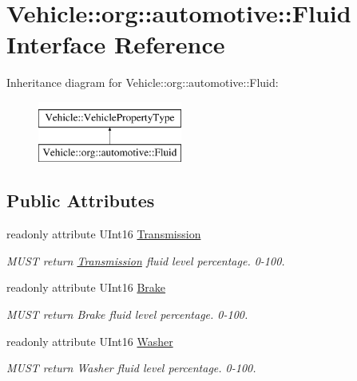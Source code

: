 \hypertarget{interfaceVehicle_1_1org_1_1automotive_1_1Fluid}{\section{Vehicle\-:\-:org\-:\-:automotive\-:\-:Fluid Interface Reference}
\label{interfaceVehicle_1_1org_1_1automotive_1_1Fluid}
}
Inheritance diagram for Vehicle\-:\-:org\-:\-:automotive\-:\-:Fluid\-:\begin{figure}[H]
\begin{center}
\leavevmode
\includegraphics[height=2.000000cm]{interfaceVehicle_1_1org_1_1automotive_1_1Fluid}
\end{center}
\end{figure}
\subsection*{Public Attributes}
\begin{DoxyCompactItemize}
\item 
readonly attribute U\-Int16 \hyperlink{interfaceVehicle_1_1org_1_1automotive_1_1Fluid_ad5c508a2122623f20227b95b4f67dd85}{Transmission}
\begin{DoxyCompactList}\small\item\em M\-U\-S\-T return \hyperlink{interfaceVehicle_1_1org_1_1automotive_1_1Transmission}{Transmission} fluid level percentage. 0-\/100. \end{DoxyCompactList}\item 
readonly attribute U\-Int16 \hyperlink{interfaceVehicle_1_1org_1_1automotive_1_1Fluid_af87901cbef12663090e0eb952caff3ad}{Brake}
\begin{DoxyCompactList}\small\item\em M\-U\-S\-T return Brake fluid level percentage. 0-\/100. \end{DoxyCompactList}\item 
readonly attribute U\-Int16 \hyperlink{interfaceVehicle_1_1org_1_1automotive_1_1Fluid_a71da44ddb1ffff3ac8bb986641b5780e}{Washer}
\begin{DoxyCompactList}\small\item\em M\-U\-S\-T return Washer fluid level percentage. 0-\/100. \end{DoxyCompactList}\end{DoxyCompactItemize}


